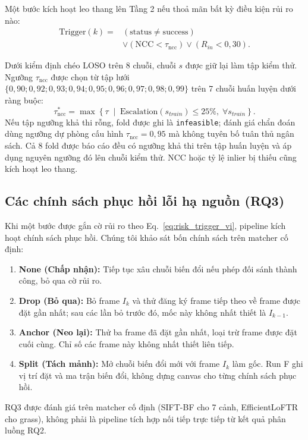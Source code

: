 \documentclass[conference]{IEEEtran}
\begin{document}
Một bước kích hoạt leo thang lên Tầng 2 nếu thoả mãn bất kỳ điều kiện rủi ro nào:
\begin{equation}
\begin{aligned}
\text{Trigger}(k)={}&(\text{status}\neq\text{success})\\
 &\lor(\text{NCC}<\tau_{\mathrm{ncc}})\lor(R_{in}<0{,}30).
\end{aligned}
\label{eq:risk_trigger_vi}
\end{equation}

Dưới kiểm định chéo LOSO trên 8 chuỗi, chuỗi $s$ được giữ lại làm tập kiểm thử. Ngưỡng $\tau_{\mathrm{ncc}}$ được chọn từ tập lưới $\{0{,}90; 0{,}92; 0{,}93; 0{,}94; 0{,}95; 0{,}96; 0{,}97; 0{,}98; 0{,}99\}$ trên 7 chuỗi huấn luyện dưới ràng buộc:
\begin{equation}
\tau_{\mathrm{ncc}}^* = \max \left\{ \tau \;\middle|\; \text{Escalation}(s_{train}) \le 25\%, \; \forall s_{train} \right\}.
\label{eq:loso_budget_vi}
\end{equation}
Nếu tập ngưỡng khả thi rỗng, fold được ghi là \texttt{infeasible}; đánh giá chẩn đoán dùng ngưỡng dự phòng cấu hình $\tau_{\mathrm{ncc}}=0{,}95$ mà không tuyên bố tuân thủ ngân sách. Cả 8 fold được báo cáo đều có ngưỡng khả thi trên tập huấn luyện và áp dụng nguyên ngưỡng đó lên chuỗi kiểm thử. NCC hoặc tỷ lệ inlier bị thiếu cũng kích hoạt leo thang.

\subsection{Các chính sách phục hồi lỗi hạ nguồn (RQ3)}
\label{subsec:recovery_method}

Khi một bước được gắn cờ rủi ro theo Eq.~\eqref{eq:risk_trigger_vi}, pipeline kích hoạt chính sách phục hồi. Chúng tôi khảo sát bốn chính sách trên matcher cố định:
\begin{enumerate}
    \item \textbf{None (Chấp nhận):} Tiếp tục xâu chuỗi biến đổi nếu phép đối sánh thành công, bỏ qua cờ rủi ro.
    \item \textbf{Drop (Bỏ qua):} Bỏ frame $I_k$ và thử đăng ký frame tiếp theo về frame được đặt gần nhất; sau các lần bỏ trước đó, mốc này không nhất thiết là $I_{k-1}$.
    \item \textbf{Anchor (Neo lại):} Thử ba frame đã đặt gần nhất, loại trừ frame được đặt cuối cùng. Chỉ số các frame này không nhất thiết liên tiếp.
    \item \textbf{Split (Tách mảnh):} Mở chuỗi biến đổi mới với frame $I_k$ làm gốc. Run F ghi vị trí đặt và ma trận biến đổi, không dựng canvas cho từng chính sách phục hồi.
\end{enumerate}
RQ3 được đánh giá trên matcher cố định (SIFT-BF cho 7 cảnh, EfficientLoFTR cho grass), không phải là pipeline tích hợp nối tiếp trực tiếp từ kết quả phân luồng RQ2.
\end{document}

